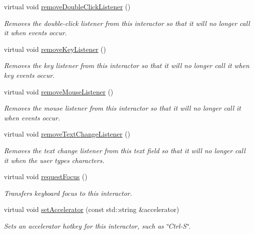 \begin{DoxyCompactItemize}
virtual void \mbox{\hyperlink{classGInteractor_aa4250907e4cdd77349c04f0cf5cdd3d3}{remove\+Double\+Click\+Listener}} ()
\begin{DoxyCompactList}\small\item\em Removes the double-\/click listener from this interactor so that it will no longer call it when events occur. \end{DoxyCompactList}\item 
virtual void \mbox{\hyperlink{classGInteractor_a43095f41cab3be732b49f29970484b05}{remove\+Key\+Listener}} ()
\begin{DoxyCompactList}\small\item\em Removes the key listener from this interactor so that it will no longer call it when key events occur. \end{DoxyCompactList}\item 
virtual void \mbox{\hyperlink{classGInteractor_aff47f71ce47e688a07c9d38dc92fcc11}{remove\+Mouse\+Listener}} ()
\begin{DoxyCompactList}\small\item\em Removes the mouse listener from this interactor so that it will no longer call it when events occur. \end{DoxyCompactList}\item 
virtual void \mbox{\hyperlink{classGTextField_a69c940b99d01eb7c353763ce4b0942a4}{remove\+Text\+Change\+Listener}} ()
\begin{DoxyCompactList}\small\item\em Removes the text change listener from this text field so that it will no longer call it when the user types characters. \end{DoxyCompactList}\item 
virtual void \mbox{\hyperlink{classGInteractor_a519fb2ac767f8b2febbb50b898b8c8cb}{request\+Focus}} ()
\begin{DoxyCompactList}\small\item\em Transfers keyboard focus to this interactor. \end{DoxyCompactList}\item 
virtual void \mbox{\hyperlink{classGInteractor_ad15f102f62e2960576012f1aa0ba4b2e}{set\+Accelerator}} (const std\+::string \&accelerator)
\begin{DoxyCompactList}\small\item\em Sets an accelerator hotkey for this interactor, such as \char`\"{}\+Ctrl-\/\+S\char`\"{}. \end{DoxyCompactList}\item 

\end{DoxyCompactItemize}
